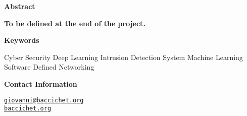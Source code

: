 \thispagestyle{empty}

{\bf\Huge Abstract}

\vspace{1cm}

\faEdit \quad \textbf{To be defined at the end of the project.} \\

\textcolor{dimgray}{\lipsum[1-3]}

\vspace{1cm}

{\bf\Huge Keywords}

\vspace{1cm}

\begin{itemize}
    \itemAR Cyber Security
    \itemAR Deep Learning
    \itemAR Intrusion Detection System
    \itemAR Machine Learning
    \itemAR Software Defined Networking
\end{itemize}

\vspace{1cm}

{\bf\Huge Contact Information}

\vspace{1cm}

\faEnvelope[regular] \quad \href{mailto:giovanni@baccichet.org}{\texttt{giovanni@baccichet.org}} \\

\faGlobeAmericas \quad\; \href{https://baccichet.org}{\texttt{baccichet.org}}


